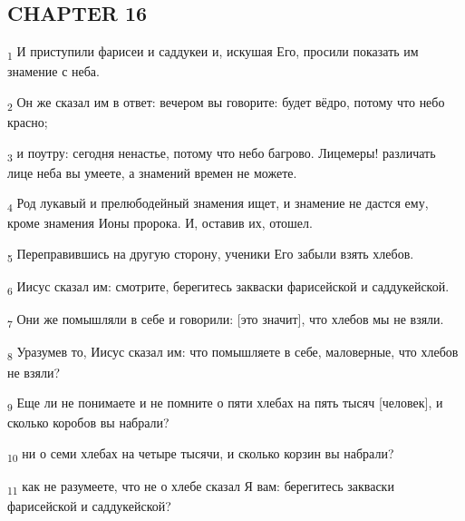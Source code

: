 \subsection{CHAPTER 16}
\begin{tcolorbox}
\textsubscript{1} И приступили фарисеи и саддукеи и, искушая Его, просили показать им знамение с неба.
\end{tcolorbox}
\begin{tcolorbox}
\textsubscript{2} Он же сказал им в ответ: вечером вы говорите: будет вёдро, потому что небо красно;
\end{tcolorbox}
\begin{tcolorbox}
\textsubscript{3} и поутру: сегодня ненастье, потому что небо багрово. Лицемеры! различать лице неба вы умеете, а знамений времен не можете.
\end{tcolorbox}
\begin{tcolorbox}
\textsubscript{4} Род лукавый и прелюбодейный знамения ищет, и знамение не дастся ему, кроме знамения Ионы пророка. И, оставив их, отошел.
\end{tcolorbox}
\begin{tcolorbox}
\textsubscript{5} Переправившись на другую сторону, ученики Его забыли взять хлебов.
\end{tcolorbox}
\begin{tcolorbox}
\textsubscript{6} Иисус сказал им: смотрите, берегитесь закваски фарисейской и саддукейской.
\end{tcolorbox}
\begin{tcolorbox}
\textsubscript{7} Они же помышляли в себе и говорили: [это значит], что хлебов мы не взяли.
\end{tcolorbox}
\begin{tcolorbox}
\textsubscript{8} Уразумев то, Иисус сказал им: что помышляете в себе, маловерные, что хлебов не взяли?
\end{tcolorbox}
\begin{tcolorbox}
\textsubscript{9} Еще ли не понимаете и не помните о пяти хлебах на пять тысяч [человек], и сколько коробов вы набрали?
\end{tcolorbox}
\begin{tcolorbox}
\textsubscript{10} ни о семи хлебах на четыре тысячи, и сколько корзин вы набрали?
\end{tcolorbox}
\begin{tcolorbox}
\textsubscript{11} как не разумеете, что не о хлебе сказал Я вам: берегитесь закваски фарисейской и саддукейской?
\end{tcolorbox}
